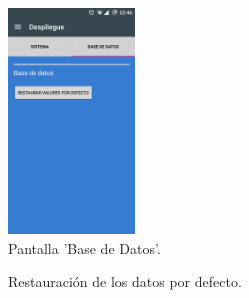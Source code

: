 \documentclass[../PFC.tex]{subfiles}
\begin{document}
\begin{figure}[H]
  \centering
  \includegraphics[width=0.3\textwidth]{./img/app/despliegueBaseDeDatos}
  \caption{Pantalla 'Base de Datos'.}
  \label{img:app:baseDatos1}
\end{figure}  

\begin{figure}[H]
  \centering
  \null\hfill
  \caption{Restauración de los datos por defecto.}
  \label{img:app:baseDatos2}
\end{figure}
\end{document}
